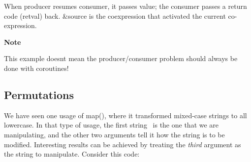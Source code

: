 
When producer resumes consumer, it passes \textsf{value}; the consumer
passes a return code (\textsf{retval}) back. \textsf{\&source} is the
coexpression that activated the current co-expression.

{\sffamily\bfseries
Note}

{\sffamily
This example doesn{\textquotesingle}t mean the producer/consumer problem
should always be done with coroutines!}

\subsection[Permutations]{Permutations}

We have seen one usage of
\textsf{map()}, where it transformed mixed-case strings to
all lowercase. In that type of usage, the first string \ is the one
that we are manipulating, and the other two arguments tell it how the
string is to be modified. Interesting results can be achieved by
treating the \textit{third} argument as the string to manipulate.
Consider this code:

